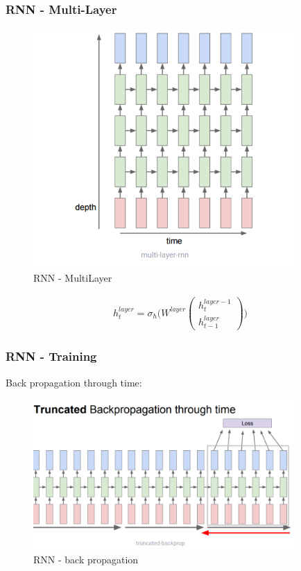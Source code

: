 \documentclass{article}
\begin{document}
\subsubsection{RNN - Multi-Layer}
\begin{figure}[H]\centering\includegraphics[width=10cm]{RNN_MULTI.png}\caption{RNN - MultiLayer}\end{figure}
\begin{align*}
h_t^{layer} = \sigma_h \bigg(W^{layer} \begin{pmatrix}
h_{t}^{layer-1} \\ h_{t-1}^{layer}
\end{pmatrix} \bigg)
\end{align*}


\subsubsection{RNN - Training }
Back propagation through time:
\begin{figure}[H]\centering\includegraphics[width=10cm]{RNN_BACKPROP.png}\caption{RNN - back propagation}\end{figure}
\end{document}
